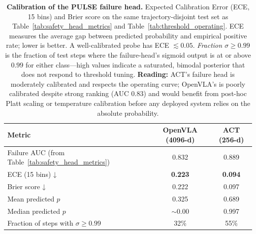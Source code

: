 \begin{table}[t]
\centering
\caption{\textbf{Calibration of the PULSE failure head.} Expected Calibration Error (ECE, 15 bins) and Brier score on the same trajectory-disjoint test set as Table~\ref{tab:safety_head_metrics} and Table~\ref{tab:threshold_operating}. ECE measures the average gap between predicted probability and empirical positive rate; lower is better. A well-calibrated probe has ECE $\lesssim 0.05$. \emph{Fraction $\sigma{\ge}0.99$} is the fraction of test steps where the failure-head's sigmoid output is at or above $0.99$ for either class---high values indicate a saturated, bimodal posterior that does not respond to threshold tuning. \textbf{Reading:} ACT's failure head is moderately calibrated and respects the operating curve; OpenVLA's is poorly calibrated despite strong ranking (AUC $0.83$) and would benefit from post-hoc Platt scaling or temperature calibration before any deployed system relies on the absolute probability.}
\label{tab:calibration}
\begin{tabular}{lcc}
\toprule
Metric & OpenVLA (4096-d) & ACT (256-d) \\
\midrule
Failure AUC (from Table~\ref{tab:safety_head_metrics})       & 0.832 & 0.889 \\
\midrule
ECE (15 bins) ↓                                              & \textbf{0.223} & \textbf{0.094} \\
Brier score ↓                                                & 0.222 & 0.097 \\
Mean predicted $p$                                           & 0.325 & 0.689 \\
Median predicted $p$                                         & $\sim$0.00 & 0.997 \\
Fraction of steps with $\sigma{\ge}0.99$                     & 32\% & 55\% \\
\bottomrule
\end{tabular}
\end{table}
